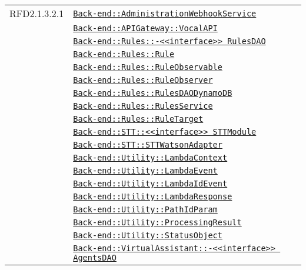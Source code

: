 \begin{longtable}{|>{\centering}m{3cm}|m{10cm}<{\centering}|}
RFD2.1.3.2.1 & \hyperref[Back-end::AdministrationWebhookService]{\texttt{Back-end::AdministrationWebhookService}}\\
& \hyperref[Back-end::APIGateway::VocalAPI]{\texttt{Back-end::APIGateway::VocalAPI}}\\
& \hyperref[Back-end::Rules::<<interface>> RulesDAO]{\texttt{Back-end::Rules::-\linebreak <<interface>> RulesDAO}}\\
& \hyperref[Back-end::Rules::Rule]{\texttt{Back-end::Rules::Rule}}\\
& \hyperref[Back-end::Rules::RuleObservable]{\texttt{Back-end::Rules::RuleObservable}}\\
& \hyperref[Back-end::Rules::RuleObserver]{\texttt{Back-end::Rules::RuleObserver}}\\
& \hyperref[Back-end::Rules::RulesDAODynamoDB]{\texttt{Back-end::Rules::RulesDAODynamoDB}}\\
& \hyperref[Back-end::Rules::RulesService]{\texttt{Back-end::Rules::RulesService}}\\
& \hyperref[Back-end::Rules::RuleTarget]{\texttt{Back-end::Rules::RuleTarget}}\\
& \hyperref[Back-end::STT::<<interface>> STTModule]{\texttt{Back-end::STT::<<interface>> STTModule}}\\
& \hyperref[Back-end::STT::STTWatsonAdapter]{\texttt{Back-end::STT::STTWatsonAdapter}}\\
& \hyperref[Back-end::Utility::LambdaContext]{\texttt{Back-end::Utility::LambdaContext}}\\
& \hyperref[Back-end::Utility::LambdaEvent]{\texttt{Back-end::Utility::LambdaEvent}}\\
& \hyperref[Back-end::Utility::LambdaIdEvent]{\texttt{Back-end::Utility::LambdaIdEvent}}\\
& \hyperref[Back-end::Utility::LambdaResponse]{\texttt{Back-end::Utility::LambdaResponse}}\\
& \hyperref[Back-end::Utility::PathIdParam]{\texttt{Back-end::Utility::PathIdParam}}\\
& \hyperref[Back-end::Utility::ProcessingResult]{\texttt{Back-end::Utility::ProcessingResult}}\\
& \hyperref[Back-end::Utility::StatusObject]{\texttt{Back-end::Utility::StatusObject}}\\
& \hyperref[Back-end::VirtualAssistant::<<interface>> AgentsDAO]{\texttt{Back-end::VirtualAssistant::-\linebreak <<interface>> AgentsDAO}}\\

\end{longtable}
